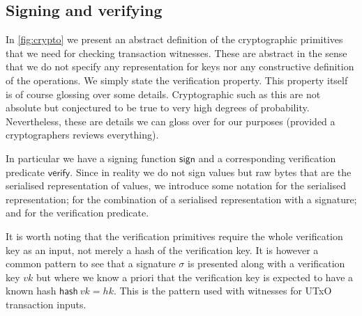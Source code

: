 \documentclass[11pt,a4paper]{article}
\newcommand{\var}[1]{\mathit{#1}}
\newcommand{\fun}[1]{\mathsf{#1}}
\begin{document}
\subsection{Signing and verifying}

In \cref{fig:crypto} we present an abstract definition of the cryptographic
primitives that we need for checking transaction witnesses. These are abstract
in the sense that we do not specify any representation for keys nor any
constructive definition of the operations. We simply state the verification
property. This property itself is of course glossing over some details.
Cryptographic such as this are not absolute but conjectured to be true to
very high degrees of probability. Nevertheless, these are details we can gloss
over for our purposes (provided a cryptographers reviews everything).

In particular we have a signing function $\fun{sign}$ and a corresponding
verification predicate $\fun{verify}$. Since in reality we do not sign values
but raw bytes that are the serialised representation of values, we introduce
some notation for the serialised representation; for the combination of a
serialised representation with a signature; and for the verification predicate.

It is worth noting that the verification primitives require the whole
verification key as an input, not merely a hash of the verification key. It is
however a common pattern to see that a signature $\sigma$ is presented along
with a verification key $\var{vk}$ but where we know a priori that the
verification key is expected to have a known hash $\fun{hash}~\var{vk} = \var{hk}$.
This is the pattern used with witnesses for UTxO transaction inputs.
\end{document}
